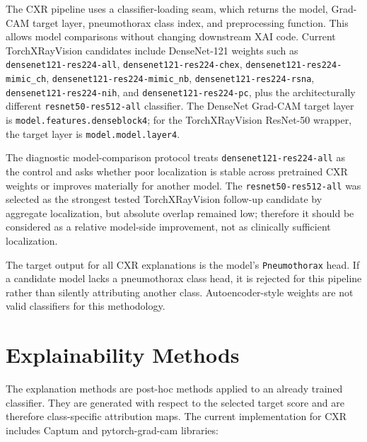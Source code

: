 The CXR pipeline uses a classifier-loading seam, which returns the model,
Grad-CAM target layer, pneumothorax class index, and preprocessing
function. This allows model comparisons without changing downstream XAI
code. Current TorchXRayVision candidates include DenseNet-121 weights
such as \texttt{densenet121-\allowbreak res224-\allowbreak all},
\texttt{densenet121-\allowbreak res224-\allowbreak chex}, \texttt{densenet121-\allowbreak res224-\allowbreak mimic\_\allowbreak ch},
\texttt{densenet121-\allowbreak res224-\allowbreak mimic\_\allowbreak nb}, \texttt{densenet121-\allowbreak res224-\allowbreak rsna},
\texttt{densenet121-\allowbreak res224-\allowbreak nih}, and \texttt{densenet121-\allowbreak res224-\allowbreak pc},
plus the architecturally different \texttt{resnet50-\allowbreak res512-\allowbreak all}
classifier. The DenseNet Grad-CAM target layer is
\texttt{model.\allowbreak features.\allowbreak denseblock4}; for the TorchXRayVision ResNet-50
wrapper, the target layer is \texttt{model.\allowbreak model.\allowbreak layer4}.

The diagnostic model-comparison protocol treats
\texttt{densenet121-\allowbreak res224-\allowbreak all} as the control and asks whether poor
localization is stable across pretrained CXR weights or improves
materially for another model. The
\texttt{resnet50-\allowbreak res512-\allowbreak all} was selected as 
the strongest tested TorchXRayVision
follow-up candidate by aggregate localization, but absolute overlap
remained low; therefore it should be considered as a relative model-side
improvement, not as clinically sufficient localization.

The target output for all CXR explanations is the model's
\texttt{Pneumothorax} head. If a candidate model lacks a pneumothorax
class head, it is rejected for this pipeline rather than silently
attributing another class. Autoencoder-style weights are not valid
classifiers for this methodology.

\hypertarget{explainability-methods}{%
	\section{Explainability Methods}\label{explainability-methods}}

The explanation methods are post-hoc methods applied to an already
trained classifier. They are generated with respect to the selected
target score and are therefore class-specific attribution maps. The
current implementation for CXR includes Captum \cite{ref-captum-docs} and
pytorch-grad-cam \cite{ref-pytorch-gradcam} libraries:

